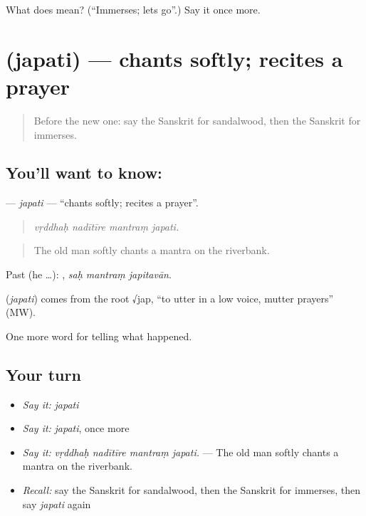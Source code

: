 \begin{tcolorbox}[breakable,colback=teal!4,colframe=teal!35!black,title={Before you move on}]
What does  mean? (\textquotedblleft{}Immerses; lets go\textquotedblright{}.) Say it once more.
\end{tcolorbox}
\section[\texorpdfstring{\sk{जपति} (japati)}{जपति (japati)}]{ (japati) — chants softly; recites a prayer}

\label{lesson:SA-C331-japati}



\begin{quote}
Before the new one: say the Sanskrit for sandalwood, then the Sanskrit for immerses.
\end{quote}

\subsection*{You'll want to know: }
\textbf{} — \emph{japati} — \textquotedblleft{}chants softly; recites a prayer\textquotedblright{}.

\begin{quote}
   
\end{quote}

\begin{quote}
\emph{vṛddhaḥ nadītīre mantraṃ japati.}
\end{quote}

\begin{quote}
The old man softly chants a mantra on the riverbank.
\end{quote}

Past (he …):   , \emph{saḥ mantraṃ japitavān}.

\begin{cousinweb}
\textbf{} (\emph{japati}) comes from the root √jap, \textquotedblleft{}to utter in a low voice, mutter prayers\textquotedblright{} (MW).
\end{cousinweb}

\begin{grammarlens}[title={What you've built}]
One more word for telling what happened.
\end{grammarlens}

\subsection*{Your turn}
\begin{itemize}
\raggedright
  \item \emph{Say it:} \emph{japati}
  \item \emph{Say it:} \emph{japati}, once more
  \item \emph{Say it:} \emph{vṛddhaḥ nadītīre mantraṃ japati.} — The old man softly chants a mantra on the riverbank.
  \item \emph{Recall:} say the Sanskrit for sandalwood, then the Sanskrit for immerses, then say \emph{japati} again
\end{itemize}


